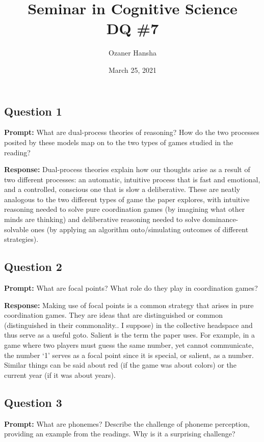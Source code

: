 \documentclass{article}
\begin{document}
\title{Seminar in Cognitive Science\\ DQ \#7}
\author{Ozaner Hansha}
\date{March 25, 2021}
\maketitle

\subsection*{Question 1}
\noindent\textbf{Prompt:} What are dual-process theories of reasoning? How do the two processes posited by these models map on to the two types of games studied in the reading?
\bigskip

\noindent\textbf{Response:} Dual-process theories explain how our thoughts arise as a result of two different processes: an automatic, intuitive process that is fast and emotional, and a controlled, conscious one that is slow a deliberative. These are neatly analogous to the two different types of game the paper explores, with intuitive reasoning needed to solve pure coordination games (by imagining what other minds are thinking) and deliberative reasoning needed to solve dominance-solvable ones (by applying an algorithm onto/simulating outcomes of different strategies).

\subsection*{Question 2}
\noindent\textbf{Prompt:} What are focal points? What role do they play in coordination games?
\bigskip

\noindent\textbf{Response:} Making use of focal points is a common strategy that arises in pure coordination games. They are ideas that are distinguished or common (distinguished in their commonality.. I suppose) in the collective headspace and thus serve as a useful goto. Salient is the term the paper uses. For example, in a game where two players must guess the same number, yet cannot communicate, the number `1' serves as a focal point since it is special, or salient, as a number. Similar things can be said about red (if the game was about colors) or the current year (if it was about years).

\subsection*{Question 3}
\noindent\textbf{Prompt:} What are phonemes? Describe the challenge of phoneme perception, providing an example from the readings. Why is it a surprising challenge?
\bigskip
\end{document}
